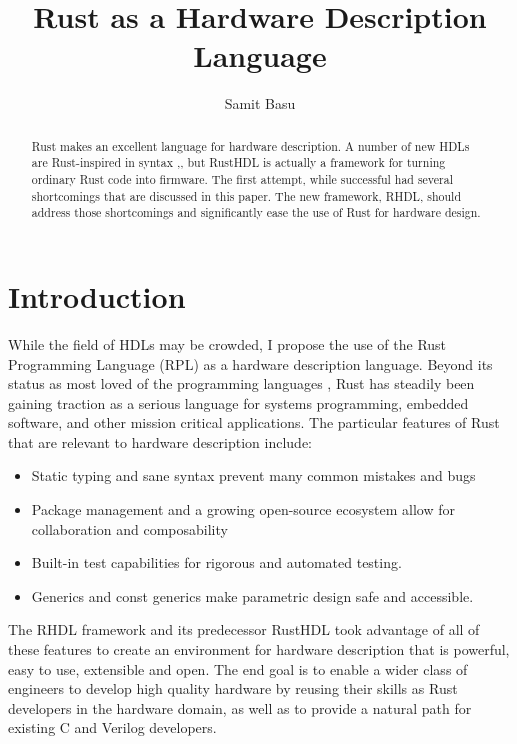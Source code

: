 \documentclass[sigplan,screen,sigconf]{acmart}
\author{Samit Basu}
\affiliation{
  basu.samit@gmail.com
  \country{Fremont CA, USA}
}
\begin{document}
\title{Rust as a Hardware Description Language}

\begin{abstract}
Rust \cite{b9} makes an excellent language for hardware description.  A number of new HDLs are 
Rust-inspired in syntax \cite{b1},\cite{b4},
but RustHDL\cite{b6} is actually a framework for turning ordinary Rust code into firmware.  The first attempt,
while successful had several shortcomings that are discussed in this paper.  The new framework, RHDL\cite{b10},
should address those shortcomings and significantly ease the use of Rust for hardware design.
\end{abstract}

\maketitle

\section{Introduction}

While the field of HDLs may be crowded, I propose the use of the Rust Programming Language (RPL)
as a hardware description language.  Beyond its status as most loved of the programming languages \cite{b0},
Rust has steadily been gaining traction as a serious language for systems programming, embedded 
software, and other mission critical applications.  The particular features of Rust that are 
relevant to hardware description include:
\begin{itemize}
\item Static typing and sane syntax prevent many common mistakes and bugs
\item Package management and a growing open-source ecosystem allow for collaboration and composability
\item Built-in test capabilities for rigorous and automated testing.
\item Generics and const generics make parametric design safe and accessible.
\end{itemize}
The RHDL framework and its predecessor RustHDL took advantage of all of these features to
create an environment for hardware description that is powerful, easy to use, extensible and
open.  The end goal is to enable a wider class of engineers to develop high quality hardware
by reusing their skills as Rust developers in the hardware domain, as well as to provide a natural path for existing C and Verilog developers. 
\end{document}
